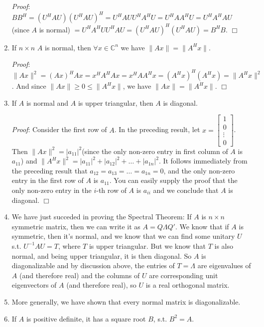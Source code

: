 \documentclass[12pt,oneside]{article}
\begin{document}
\begin{enumerate}
\emph{Proof}: $B B^H = (U^H A U) (U^H A U)^H = U^H A U U^H A^H U =
  U^H A A^H U = U^H A^H A U$ (since $A$ is normal) $= U^H A^H U U^H A
  U = (U^H A U)^H (U^H A U) = B^H B$. $\Box$

\item If $n \times n$ $A$ is normal, then $\forall x \in
  \mathbb{C}^n$ we have $\|Ax\| = \|A^H x\|$.

\emph{Proof}: $\|Ax\|^2 = (Ax)^H
  Ax = x^H A^H A x = x^H A A^H x = (A^H x)^H (A^H x) = \|A^H
  x\|^2$. And since $\|Ax\| \geq 0 \leq \|A^H x\|$, we have $\|Ax\| =
  \|A^H x\|$. $\Box$

\item If $A$ is normal and $A$ is upper triangular, then $A$ is
  diagonal.

\emph{Proof}: Consider the first row of $A$. In the preceding
  result, let $x = \left[ \begin{array} {c} 1 \\ 0 \\ \vdots \\ 0
  \end{array} \right]$. Then $\|Ax\|^2 = |a_{11}|^2$(since the only
  non-zero entry in first column of $A$ is $a_{11}$) and $\|A^H x\|^2
  = |a_{11}|^2 + |a_{12}|^2 + \ldots + |a_{1n}|^2$. It follows
  immediately from the preceding result that $a_{12} = a_{13} = \ldots
  = a_{1n} = 0$, and the only non-zero entry in the first row of $A$
  is $a_{11}$. You can easily supply the proof that the only non-zero
  entry in the $i$-th row of $A$ is $a_{ii}$ and we conclude that $A$
  is diagonal. $\Box$

\item We have just succeded in proving the Spectral Theorem: If $A$ is
  $n \times n$ symmetric matrix, then we can write it as $A =
  Q \Lambda Q'$. We know that if $A$ is symmetric, then it's normal,
  and we know that we can find some unitary $U$ s.t. $U^{-1} A U = T$,
  where $T$ is upper triangular. But we know that $T$ is also normal,
  and being upper triangular, it is then diagonal. So $A$ is
  diagonalizable and by discussion above, the entries of $T = \Lambda$
  are eigenvalues of $A$ (and therefore real) and the columns of $U$
  are corresponding unit eigenvectors of $A$ (and therefore real), so
  $U$ is a real orthogonal matrix.\

\item More generally, we have shown that every normal matrix is
  diagonalizable.

\item If $A$ is positive definite, it has a square root $B$, s.t. $B^2
  = A$.


\end{enumerate}
\end{document}
